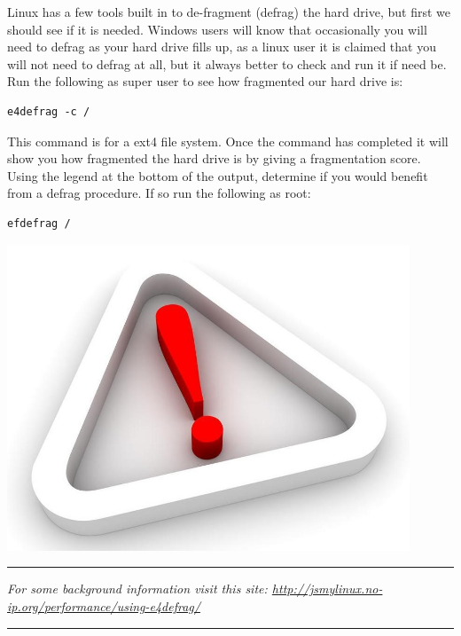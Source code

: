 Linux has a few tools built in to de-fragment (defrag) the hard drive, but first we should see if it is needed.  Windows users will know that occasionally you will need to defrag as your hard drive fills up, as a linux user it is claimed that you will not need to defrag at all, but it always better to check and run it if need be.  Run the following as super user to see how fragmented our hard drive is:

\begin{lstlisting}
e4defrag -c /
\end{lstlisting}

This command is for a ext4 file system.  Once the command has completed it will show you how fragmented the hard drive is by giving a fragmentation score.  Using the legend at the bottom of the output, determine if you would benefit from a defrag procedure.  If so run the following as root:

\begin{lstlisting}
efdefrag /
\end{lstlisting}

\vspace*{0.5cm}
\begin{minipage}{0.3\textwidth}
\begin{flushleft} 
\includegraphics[width=0.9\textwidth]{./supportfiles/point.jpg}
\end{flushleft}
\end{minipage}
\begin{minipage}{0.6\textwidth}
\begin{flushright}
\hrule
\vspace*{0.25cm}
\textit{For some background information visit this site: \url{http://jsmylinux.no-ip.org/performance/using-e4defrag/}}
\vspace{0.25cm}
\hrule
\end{flushright}
\end{minipage}
\vspace*{0.5cm}